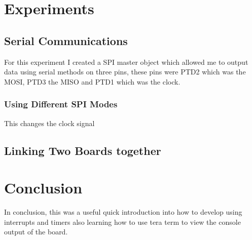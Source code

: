 \documentclass[a4paper,12pt]{scrartcl}
\begin{document}
	\section{Experiments}
	{
		\subsection{Serial Communications}
		{
			For this experiment I created a SPI master object which allowed me to output data using serial methods on three pins, these pins were PTD2 which was the MOSI, PTD3 the MISO and PTD1 which was the clock.
			\subsubsection{Using Different SPI Modes}
			{
				This changes the clock signal
			}
		}
		\subsection{Linking Two Boards together}
		{

		}
	}

	\section{Conclusion}
	{
		In conclusion, this was a useful quick introduction into how to develop using interrupts and timers also learning how to use tera term to view the console output of the board.
	}
	
	\newpage
	
	\printbibliography[heading=bibintoc,title=References]
\end{document}
